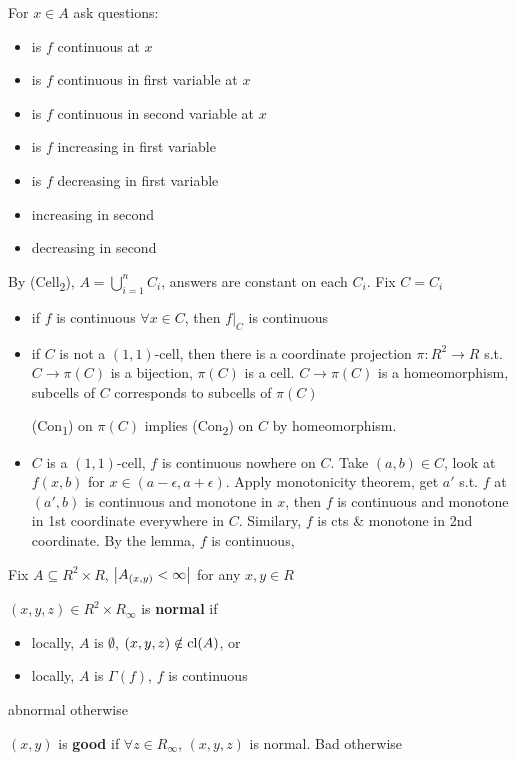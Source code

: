 \documentclass[11pt]{article}
\begin{document}
For \(x\in A\) ask questions:
\begin{itemize}
\item is \(f\) continuous at \(x\)
\item is \(f\) continuous in first variable at \(x\)
\item is \(f\) continuous in second variable at \(x\)
\item is \(f\) increasing in first variable
\item is \(f\) decreasing in first variable
\item increasing in second
\item decreasing in second
\end{itemize}
By (Cell\textsubscript{2}), \(A=\bigcup_{i=1}^nC_i\), answers are constant on each \(C_i\). Fix \(C=C_i\)
\begin{itemize}
\item if \(f\) is continuous \(\forall x\in C\), then \(f|_C\) is continuous
\item if \(C\) is not a \((1,1)\)-cell, then there is a coordinate projection \(\pi:R^2\to R\)
s.t. \(C\to\pi(C)\) is a bijection, \(\pi(C)\) is a cell. \(C\to\pi(C)\) is a homeomorphism, subcells
of \(C\) corresponds to subcells of \(\pi(C)\)

(Con\textsubscript{1}) on \(\pi(C)\) implies (Con\textsubscript{2}) on \(C\) by homeomorphism.
\item \(C\) is a \((1,1)\)-cell, \(f\) is continuous nowhere on \(C\). Take \((a,b)\in C\), look
at \(f(x,b)\) for \(x\in(a-\epsilon,a+\epsilon)\). Apply monotonicity theorem, get \(a'\) s.t. \(f\)
at \((a',b)\) is continuous and monotone in \(x\), then \(f\) is continuous and monotone in
1st coordinate everywhere in \(C\). Similary, \(f\) is cts \& monotone in 2nd coordinate. By
the lemma, \(f\) is continuous,
\end{itemize}

Fix \(A\subseteq R^2\times R\), \(\abs{A_{(x,y)}<\infty}\) for any \(x,y\in R\)

\begin{definition}[]
\((x,y,z)\in R^2\times R_{\infty}\) is \textbf{normal} if
\begin{itemize}
\item locally, \(A\) is \(\emptyset\), \((x,y,z)\notin\operatorname{\text{cl}}(A)\), or
\item locally, \(A\) is \(\Gamma(f)\), \(f\) is continuous
\end{itemize}

abnormal otherwise

\((x,y)\) is \textbf{good} if \(\forall z\in R_{\infty}\), \((x,y,z)\) is normal. Bad otherwise
\end{definition}
\end{document}
